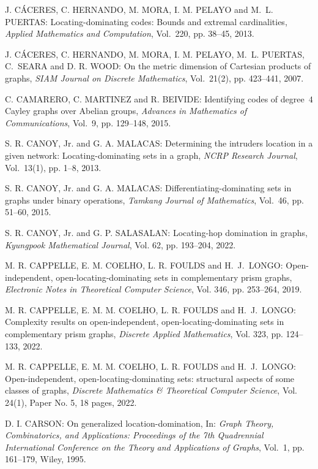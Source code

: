 \begin{thebibliography}{999}
J. C\'ACERES, C. HERNANDO, M. MORA, I. M. PELAYO and M.~L. PUERTAS: Locating-dominating codes: Bounds and extremal cardinalities, {\it Applied Mathematics and Computation}, Vol.~220, pp. 38--45, 2013.

J. C\'ACERES, C. HERNANDO, M. MORA, I. M. PELAYO, M.~L. PUERTAS, C.~SEARA and D. R. WOOD: On the metric dimension of Cartesian products of graphs, {\it SIAM Journal on Discrete Mathematics}, Vol.~21(2), pp. 423--441, 2007. 

C. CAMARERO, C. MARTINEZ and R. BEIVIDE: Identifying codes of degree~$4$ Cayley graphs over Abelian groups, {\it Advances in Mathematics of Communications}, Vol.~9, pp. 129--148, 2015.

S. R. CANOY, Jr. and G. A. MALACAS: Determining the intruders location in a given network: Locating-dominating sets in a graph, {\it NCRP Research Journal}, Vol.~13(1), pp. 1--8, 2013.

S. R. CANOY, Jr. and G. A. MALACAS: Differentiating-dominating sets in graphs under binary operations, {\it Tamkang Journal of Mathematics}, Vol.~46, pp. 51--60, 2015.

S. R. CANOY, Jr. and G. P. SALASALAN: Locating-hop domination in graphs, {\it Kyungpook Mathematical Journal}, Vol. 62, pp. 193--204, 2022.

M. R. CAPPELLE, E. M. COELHO, L. R. FOULDS and H.~J.~LONGO: Open-independent, open-locating-dominating sets in complementary prism graphs, {\it Electronic Notes in Theoretical Computer Science}, Vol. 346, pp. 253--264, 2019.

M. R. CAPPELLE, E. M. M. COELHO, L. R. FOULDS and H.~J.~LONGO: Complexity results on open-independent, open-locating-dominating sets in complementary prism graphs, {\it Discrete Applied Mathematics}, Vol. 323, pp. 124--133, 2022.

M. R. CAPPELLE, E. M. M. COELHO, L. R. FOULDS and H.~J.~LONGO: Open-independent, open-locating-dominating sets: structural aspects of some classes of graphs, {\it Discrete Mathematics \& Theoretical Computer Science}, Vol. 24(1), Paper No. 5, 18 pages, 2022.

D. I. CARSON: On generalized location-domination, In: {\it Graph Theory, Combinatorics, and Applications: Proceedings of the 7th Quadrennial International Conference on the Theory and Applications of Graphs}, Vol.~1, pp. 161--179, Wiley, 1995.


\end{thebibliography}

